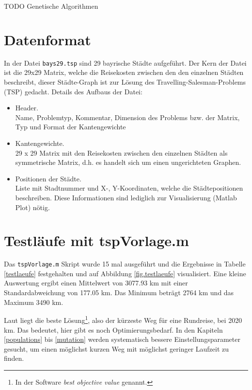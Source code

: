 TODO Genetische Algorithmen


\section{Datenformat}

\noindent In der Datei {\tt bays29.tsp} sind 29 bayrische Städte aufgeführt.
Der Kern der Datei ist die 29x29 Matrix, welche die Reisekosten zwischen
den den einzelnen Städten beschreibt, dieser Städte-Graph ist zur Lösung
des Travelling-Salesman-Problems (TSP) gedacht.
Details des Aufbaus der Datei:

\begin{itemize}
  \item Header.\\
  Name, Problemtyp, Kommentar, Dimension des Problems bzw. der Matrix, Typ und Format der Kantengewichte
  \item Kantengewichte.\\
  29 x 29 Matrix mit den Reisekosten zwischen den einzelnen Städten als symmetrische Matrix, d.h. es handelt sich um einen ungerichteten Graphen.
  \item Positionen der Städte.\\
  Liste mit Stadtnummer und X-, Y-Koordinaten, welche die Städtepositionen beschreiben.
  Diese Informationen sind lediglich zur Visualisierung (Matlab Plot) nötig.
\end{itemize}


\section{Testläufe mit tspVorlage.m}

Das {\tt tspVorlage.m} Skript wurde 15 mal ausgeführt und die Ergebnisse in
Tabelle \ref{testlaeufe} festgehalten und auf Abbildung \ref{fig.testlaeufe}
visualisiert.
Eine kleine Auswertung ergibt einen Mittelwert von 3077.93 km mit
einer Standardabweichung von 177.05 km.
Das Minimum beträgt 2764 km und das Maximum 3490 km.

Laut \cite{aufg} liegt die beste
Lösung\footnote{In der Software \emph{best objective value} genannt.},
also der kürzeste Weg für eine Rundreise, bei 2020 km.
Das bedeutet, hier gibt es noch Optimierungsbedarf.
In den Kapiteln \ref{populations} bis \ref{mutation} werden systematisch bessere Einstellungsparameter
gesucht, um einen möglichst kurzen Weg mit möglichst geringer Laufzeit zu finden.

